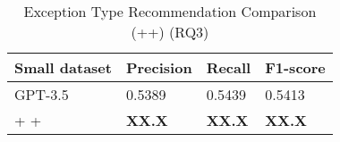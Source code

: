 \begin{table}[t]%
  \caption{Exception Type Recommendation Comparison (\xblock+\xstate+\xtype) (RQ3)}
  \vspace{-12pt}
  \small
	\begin{center}
		\renewcommand{\arraystretch}{1}
		\begin{tabular}{| p{3.10cm}<{\centering} | p{1.2cm}<{\centering} | p{1.2cm}<{\centering}| p{1.2cm}<{\centering}|}
		  \hline
			Small dataset  & Precision  & Recall & F1-score \\
			\hline
                        GPT-3.5 & 0.5389 & 0.5439 & 0.5413 \\
			\hline
			\xblock + \xstate  + \xtype  & \textbf{XX.X}  &  \textbf{XX.X} & \textbf{XX.X}\\
			\hline
		\end{tabular}
		\label{tab:xtype-2}
	\end{center}

\end{table}